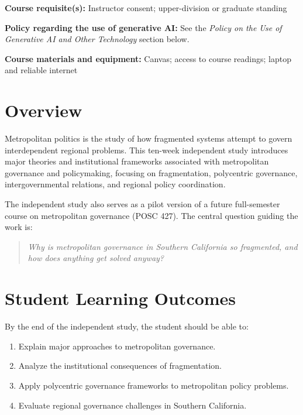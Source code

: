 \documentclass[12pt]{article}
\begin{document}
\vspace{0.5em}
\begin{flatlist}
\item \textbf{Course requisite(s):} Instructor consent; upper-division or graduate standing
\item \textbf{Policy regarding the use of generative AI:} See the \emph{Policy on the Use of Generative AI and Other Technology} section below.
\item \textbf{Course materials and equipment:} Canvas; access to course readings; laptop and reliable internet
\end{flatlist}

\section*{Overview}

{\setlength{\parindent}{0pt}\setlength{\parskip}{0.6\baselineskip}%
Metropolitan politics is the study of how fragmented systems attempt to govern interdependent regional problems. This ten-week independent study introduces major theories and institutional frameworks associated with metropolitan governance and policymaking, focusing on fragmentation, polycentric governance, intergovernmental relations, and regional policy coordination.

The independent study also serves as a pilot version of a future full-semester course on metropolitan governance (POSC 427). The central question guiding the work is:

\begin{quote}
\textit{Why is metropolitan governance in Southern California so fragmented, and how does anything get solved anyway?}
\end{quote}
}

\section*{Student Learning Outcomes}

{\setlength{\parindent}{0pt}\setlength{\parskip}{0.6\baselineskip}%
By the end of the independent study, the student should be able to:

\begin{enumerate}
    \item Explain major approaches to metropolitan governance.
    \item Analyze the institutional consequences of fragmentation.
    \item Apply polycentric governance frameworks to metropolitan policy problems.
    \item Evaluate regional governance challenges in Southern California.
\end{enumerate}
}
\end{document}
